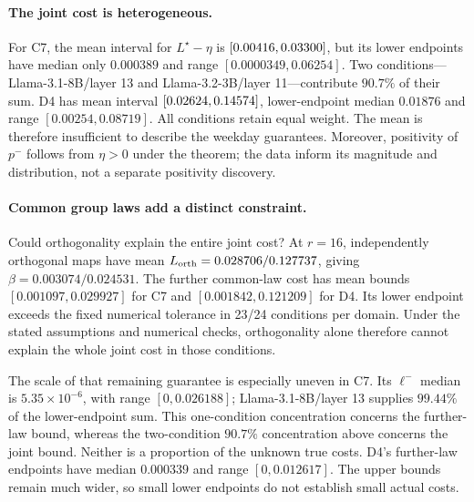 \paragraph{The joint cost is heterogeneous.}
For C7, the mean interval for $L^\star-\eta$ is $[0.00416,0.03300]$, but its lower endpoints have median only $0.000389$ and range $[0.0000349,0.06254]$. Two conditions---Llama-3.1-8B/layer 13 and Llama-3.2-3B/layer 11---contribute $90.7\%$ of their sum. D4 has mean interval $[0.02624,0.14574]$, lower-endpoint median $0.01876$ and range $[0.00254,0.08719]$. All conditions retain equal weight. The mean is therefore insufficient to describe the weekday guarantees. Moreover, positivity of $p^-$ follows from $\eta>0$ under the theorem; the data inform its magnitude and distribution, not a separate positivity discovery.

\paragraph{Common group laws add a distinct constraint.}
\label{par:orthogonal-results}
Could orthogonality explain the entire joint cost? At $r=16$, independently orthogonal maps have mean $L_{\rm orth}=0.028706/0.127737$, giving $\beta=0.003074/0.024531$. The further common-law cost has mean bounds $[0.001097,0.029927]$ for C7 and $[0.001842,0.121209]$ for D4. Its lower endpoint exceeds the fixed numerical tolerance in 23/24 conditions per domain. Under the stated assumptions and numerical checks, orthogonality alone therefore cannot explain the whole joint cost in those conditions.

The scale of that remaining guarantee is especially uneven in C7. Its $\ell^-$ median is $5.35\times10^{-6}$, with range $[0,0.026188]$; Llama-3.1-8B/layer 13 supplies $99.44\%$ of the lower-endpoint sum. This one-condition concentration concerns the further-law bound, whereas the two-condition $90.7\%$ concentration above concerns the joint bound. Neither is a proportion of the unknown true costs. D4's further-law endpoints have median $0.000339$ and range $[0,0.012617]$. The upper bounds remain much wider, so small lower endpoints do not establish small actual costs.


